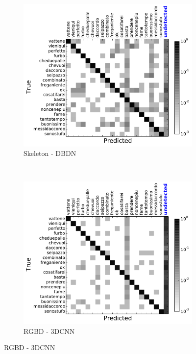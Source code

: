 \begin{figure}[t]
        \centering
        \begin{subfigure}[c]{.36\textwidth}
                \includegraphics[width=\textwidth]{images/cm/cm_sk}
\vspace*{-3mm}
                \caption{Skeleton - DBDN}
                \label{sk_cm}
        \end{subfigure}%
        ~ %

        \begin{subfigure}[c]{0.36\textwidth}
                \includegraphics[width=\textwidth]{images/cm/cm_cnn}
\vspace*{-3mm}
                \caption{RGBD - 3DCNN}
                \label{cnn_cm}
        \end{subfigure}


\end{figure}
